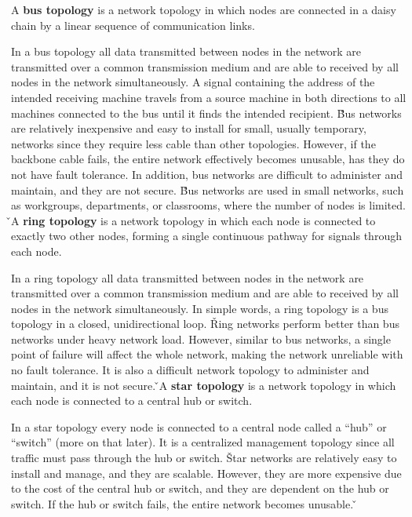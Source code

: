 A \textbf{bus topology} is a network topology in which nodes are connected in a daisy chain by a linear sequence of
communication links.
\ed

In a bus topology all data transmitted between nodes in the network are transmitted over a common transmission medium
and are able to received by all nodes in the network simultaneously. A signal containing the address of the intended
receiving machine travels from a source machine in both directions to all machines connected to the bus until it
finds the intended recipient. \v

Bus networks are relatively inexpensive and easy to install for small, usually temporary, networks since they require
less cable than other topologies. However, if the backbone cable fails, the entire network effectively becomes
unusable, has they do not have fault tolerance. In addition, bus networks are difficult to administer and maintain,
and they are not secure. \v

Bus networks are used in small networks, such as workgroups, departments, or classrooms, where the number of nodes is
limited. \v

A \textbf{ring topology} is a network topology in which each node is connected to exactly two other nodes, forming a
single continuous pathway for signals through each node.
\ed

In a ring topology all data transmitted between nodes in the network are transmitted over a common transmission medium
and are able to received by all nodes in the network simultaneously. In simple words, a ring topology is a bus
topology in a closed, unidirectional loop. \v

Ring networks perform better than bus networks under heavy network load. However, similar to bus networks, a single
point of failure will affect the whole network, making the network unreliable with no fault tolerance. It is also a
difficult network topology to administer and maintain, and it is not secure. \v

A \textbf{star topology} is a network topology in which each node is connected to a central hub or switch.
\ed

In a star topology every node is connected to a central node called a ``hub'' or ``switch'' (more on that later). It is
a centralized management topology since all traffic must pass through the hub or switch. \v

Star networks are relatively easy to install and manage, and they are scalable. However, they are more expensive due to
the cost of the central hub or switch, and they are dependent on the hub or switch. If the hub or switch fails, the
entire network becomes unusable. \v

